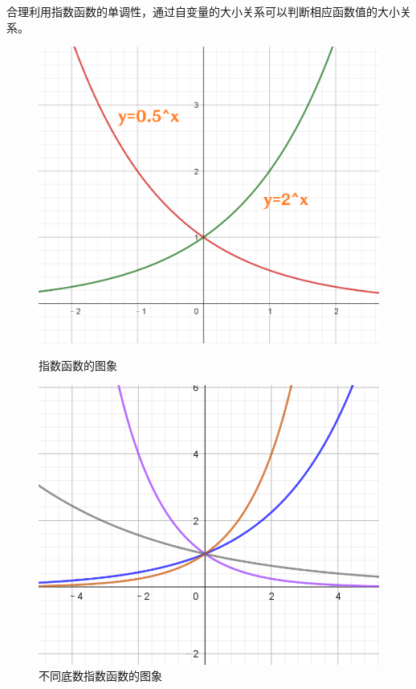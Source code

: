 \documentclass[a4paper,openany]{ctexbook}
\begin{document}
合理利用指数函数的单调性，通过自变量的大小关系可以判断相应函数值的大小关系。

\begin{figure}
    \centering
    \begin{minipage}{0.4\textwidth}
        \includegraphics[width=\textwidth]{image26.png}
        \caption{指数函数的图象}\label{828db3ce-9b02-4441-a36c-c50cdfa31f41}
    \end{minipage}
    \hfill
    \begin{minipage}{0.5\textwidth}
        \includegraphics[width=\textwidth]{image29.png}
        \caption{不同底数指数函数的图象}\label{176e6d9b-3a3e-46eb-9777-99749aabcc01}
    \end{minipage}
\end{figure}
\end{document}
